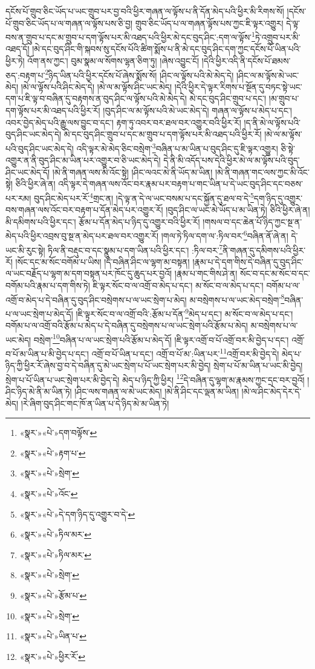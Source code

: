 དངོས་པོ་གྲུབ་ཅིང་ཡོད་པ་ཡང་གྲུབ་པར་བྱ་བའི་ཕྱིར་གཞན་ལ་ལྟོས་པ་ནི་དོན་མེད་པའི་ཕྱིར་མི་རིགས་སོ། །དངོས་པོ་གྲུབ་ཅིང་ཡོད་པ་ལ་གཞན་ལ་ལྟོས་པས་ཅི་བྱ། གྲུབ་ཅིང་ཡོད་པ་ལ་གཞན་ལྟོས་པས་ཀྱང་ཇི་ལྟར་འགྱུར། དེ་ལྟ་བས་ན་གྲུབ་པ་དང་མ་གྲུབ་པ་དག་ལྟོས་པར་མི་འཐད་པའི་ཕྱིར་མེ་དང་བུད་ཤིང་:དག་ལ་ལྟོས་\footnote{«སྣར་»«པེ་»དག་བལྟོས་}ཏེ་འགྲུབ་པར་མི་འཐད་དོ། །མེ་དང་བུད་ཤིང་གི་སྐབས་སུ་དངོས་པོའི་ཚིག་སྨོས་པ་ནི་མེ་དང་བུད་ཤིང་དག་ཀྱང་དངོས་པོ་ཡིན་པའི་ཕྱིར་ཏེ། འོག་ནས་ཀྱང་། བུམ་སྣམ་ལ་སོགས་ལྷན་ཅིག་ཏུ། །ཞེས་འབྱུང་ངོ། །དེའི་ཕྱིར་འདི་ནི་དངོས་པོ་ཐམས་ཅད་:བརྟག་པ་\footnote{«སྣར་»«པེ་»རྟག་པ་}ཉིད་ཡིན་པའི་ཕྱིར་དངོས་པོ་ཞེས་སྨོས་སོ། །ཤིང་ལ་ལྟོས་པའི་མེ་མེད་དེ། །ཤིང་ལ་མ་ལྟོས་མེ་ཡང་མེད། །མེ་ལ་ལྟོས་པའི་ཤིང་མེད་དེ། །མེ་ལ་མ་ལྟོས་ཤིང་ཡང་མེད། །དེའི་ཕྱིར་དེ་ལྟར་རིགས་པ་སྔོན་དུ་བཏང་སྟེ་ཡང་དག་པ་ཇི་ལྟ་བ་བཞིན་དུ་བརྟགས་ན་བུད་ཤིང་ལ་ལྟོས་པའི་མེ་མེད་དེ། མེ་དང་བུད་ཤིང་གྲུབ་པ་དང་། །མ་གྲུབ་པ་དག་ལྟོས་པར་མི་འཐད་པའི་ཕྱིར་རོ། །བུད་ཤིང་ལ་མ་ལྟོས་པའི་མེ་ཡང་མེད་དེ། གཞན་ལ་ལྟོས་པ་མེད་པ་དང་། འབར་བྱེད་མེད་པའི་རྒྱུ་ལས་བྱུང་བ་དང་། རྟག་ཏུ་འབར་བར་ཐལ་བར་འགྱུར་བའི་ཕྱིར་རོ། །ད་ནི་མེ་ལ་ལྟོས་པའི་བུད་ཤིང་ཡང་མེད་དེ། མེ་དང་བུད་ཤིང་གྲུབ་པ་དང་མ་གྲུབ་པ་དག་ལྟོས་པར་མི་འཐད་པའི་ཕྱིར་རོ། །མེ་ལ་མ་ལྟོས་པའི་བུད་ཤིང་ཡང་མེད་དེ། འདི་ལྟར་མེ་མེད་ཅིང་བསྲེག་\footnote{«སྣར་»«པེ་»སྲེག་}བཞིན་པ་མ་ཡིན་པ་བུད་ཤིང་དུ་ཇི་ལྟར་འགྱུར། ཅི་སྟེ་འགྱུར་ན་ནི་བུད་ཤིང་མ་ཡིན་པར་འགྱུར་བ་ཅི་ཡང་མེད་དེ། དེ་ནི་མི་འདོད་པས་དེའི་ཕྱིར་མེ་ལ་མ་ལྟོས་པའི་བུད་ཤིང་ཡང་མེད་དོ། །མེ་ནི་གཞན་ལས་མི་འོང་སྟེ། །ཤིང་ལའང་མེ་ནི་ཡོད་མ་ཡིན། །མེ་ནི་གཞན་གང་ལས་ཀྱང་མི་འོང་སྟེ། ཅིའི་ཕྱིར་ཞེ་ན། འདི་ལྟར་དེ་གཞན་ལས་འོང་བར་རྣམ་པར་བརྟག་པ་གང་ཡིན་པ་དེ་ཡང་བུད་ཤིང་དང་བཅས་པར་རམ། བུད་ཤིང་མེད་པར་རོ་\footnote{«སྣར་»«པེ་»འོང་}གྲང་ན། །དེ་ལྟ་ན་དེ་ལ་ཡང་བསམ་པ་དང་སྐྱོན་དུ་ཐལ་བ་དེ་\footnote{«སྣར་»«པེ་»དེ་དག་ཉིད་དུ་འགྱུར་བ་དེ་}དག་ཉིད་དུ་འགྱུར་བས་གཞན་ལས་འོང་བར་བརྟག་པ་དོན་མེད་པར་འགྱུར་རོ། །བུད་ཤིང་ལ་ཡང་མེ་ཡོད་པ་མ་ཡིན་ཏེ། ཅིའི་ཕྱིར་ཞེ་ན། མི་དམིགས་པའི་ཕྱིར་དང་། རྩོམ་པ་དོན་མེད་པ་ཉིད་དུ་འགྱུར་བའི་ཕྱིར་རོ། །གསལ་བ་དང་ཆེན་པོ་ཉིད་ཀྱང་སྔ་ན་མེད་པའི་ཕྱིར་འབྲས་བུ་སྔ་ན་མེད་པར་ཐལ་བར་འགྱུར་རོ། །གལ་ཏེ་ཏིལ་དག་ལ་:ཏིལ་བར་\footnote{«སྣར་»«པེ་»ཏིལ་མར་}བཞིན་ནོ་ཞེ་ན། དེ་ཡང་མི་རུང་སྟེ། ཏིལ་ནི་བརྡུང་བ་དང་སྣུམ་པ་དག་ཡིན་པའི་ཕྱིར་དང་། :ཏིལ་བར་\footnote{«སྣར་»«པེ་»ཏིལ་མར་}ནི་གཞན་དུ་དམིགས་པའི་ཕྱིར་རོ། །སོང་དང་མ་སོང་བགོམ་པ་ཡིས། །དེ་བཞིན་ཤིང་ལ་ལྷག་མ་བསྟན། །རྣམ་པ་དེ་དག་གིས་དེ་བཞིན་དུ་བུད་ཤིང་ལ་ཡང་བརྗོད་པ་ལྷག་མ་དག་བསྟན་པར་ཁོང་དུ་ཆུད་པར་བྱའོ། །རྣམ་པ་གང་གིས་ཤེ་ན། སོང་བ་དང་མ་སོང་བ་དང་བགོམ་པའི་རྣམ་པ་དག་གིས་ཏེ། ཇི་ལྟར་སོང་བ་ལ་འགྲོ་བ་མེད་པ་དང་། མ་སོང་བ་ལ་མེད་པ་དང་། བགོམ་པ་ལ་འགྲོ་བ་མེད་པ་དེ་བཞིན་དུ་བུད་ཤིང་བསྲེགས་པ་ལ་ཡང་སྲེག་པ་མེད། མ་བསྲེགས་པ་ལ་ཡང་མེད་བསྲེག་\footnote{«སྣར་»«པེ་»སྲེག་}བཞིན་པ་ལ་ཡང་སྲེག་པ་མེད་དོ། །ཇི་ལྟར་སོང་བ་ལ་འགྲོ་བའི་:རྩོམ་པ་དོན་\footnote{«སྣར་»«པེ་»རྩོམ་པ་}མེད་པ་དང་། མ་སོང་བ་ལ་མེད་པ་དང་། བགོམ་པ་ལ་འགྲོ་བའི་རྩོམ་པ་མེད་པ་དེ་བཞིན་དུ་བསྲེགས་པ་ལ་ཡང་སྲེག་པའི་རྩོམ་པ་མེད། མ་བསྲེགས་པ་ལ་ཡང་མེད། བསྲེག་\footnote{«སྣར་»«པེ་»སྲེག་}བཞིན་པ་ལ་ཡང་སྲེག་པའི་རྩོམ་པ་མེད་དོ། །ཇི་ལྟར་འགྲོ་བ་པོ་འགྲོ་བར་མི་བྱེད་པ་དང་། འགྲོ་བ་པོ་མ་ཡིན་པ་མི་བྱེད་པ་དང་། འགྲོ་བ་པོ་ཡིན་པ་དང་། འགྲོ་བ་པོ་མ་:ཡིན་པར་\footnote{«སྣར་»«པེ་»ཡིན་པ་}འགྲོ་བར་མི་བྱེད་དེ། མེད་པ་ཉིད་ཀྱི་ཕྱིར་རོ་ཞེས་བྱ་བ་དེ་བཞིན་དུ་མེ་ཡང་སྲེག་པ་པོ་ཡང་སྲེག་པར་མི་བྱེད། སྲེག་པ་པོ་མ་ཡིན་པ་ཡང་མི་བྱེད། སྲེག་པ་པོ་ཡིན་པ་ཡང་སྲེག་པར་མི་བྱེད་དེ། མེད་པ་ཉིད་ཀྱི་ཕྱིར། \footnote{«སྣར་»«པེ་»ཕྱིར་རོ་}དེ་བཞིན་དུ་ལྷག་མ་རྣམས་ཀྱང་དྲང་བར་བྱའོ། །ཤིང་ཉིད་མེ་ནི་མ་ཡིན་ཏེ། །ཤིང་ལས་གཞན་ལ་མེ་ཡང་མེད། །མེ་ནི་ཤིང་དང་ལྡན་མ་ཡིན། །མེ་ལ་ཤིང་མེད་དེར་དེ་མེད། །རེ་ཞིག་བུད་ཤིང་གང་ཁོ་ན་ཡིན་པ་དེ་ཉིད་མེ་མ་ཡིན་ཏེ། 
